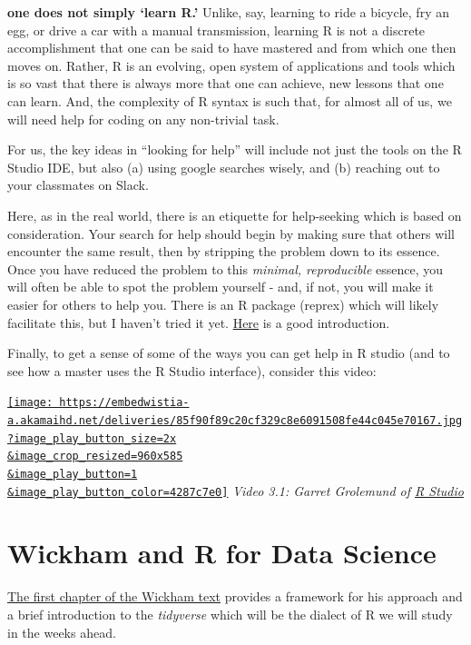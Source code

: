 \documentclass[
  openany]{book}
\begin{document}
\textbf{one does not simply `learn R.'} Unlike, say, learning to ride a bicycle, fry an egg, or drive a car with a manual transmission, learning R is not a discrete accomplishment that one can be said to have mastered and from which one then moves on. Rather, R is an evolving, open system of applications and tools which is so vast that there is always more that one can achieve, new lessons that one can learn. And, the complexity of R syntax is such that, for almost all of us, we will need help for coding on any non-trivial task.

For us, the key ideas in ``looking for help'' will include not just the tools on the R Studio IDE, but also (a) using google searches wisely, and (b) reaching out to your classmates on Slack.

Here, as in the real world, there is an etiquette for help-seeking which is based on consideration. Your search for help should begin by making sure that others will encounter the same result, then by stripping the problem down to its essence. Once you have reduced the problem to this \emph{minimal, reproducible} essence, you will often be able to spot the problem yourself - and, if not, you will make it easier for others to help you. There is an R package (reprex) which will likely facilitate this, but I haven't tried it yet. \href{https://www.tidyverse.org/help/}{Here} is a good introduction.

Finally, to get a sense of some of the ways you can get help in R studio (and to see how a master uses the R Studio interface), consider this video:

\href{https://www.rstudio.com/resources/webinars/rstudio-essentials-webinar-series-part-1/?wvideo=k8kz4e0p2v}{\texttt{[image: https://embedwistia-a.akamaihd.net/deliveries/85f90f89c20cf329c8e6091508fe44c045e70167.jpg?image\_play\_button\_size=2x\\\&image\_crop\_resized=960x585\\\&image\_play\_button=1\\\&image\_play\_button\_color=4287c7e0]}}
\emph{Video 3.1: Garret Grolemund of \href{https://www.rstudio.com/}{R Studio}}

\hypertarget{wickham-and-r-for-data-science}{%
\section{Wickham and R for Data Science}\label{wickham-and-r-for-data-science}}

\href{https://r4ds.had.co.nz/introduction.html}{The first chapter of the Wickham text} \citep{wickham2016r} provides a framework for his approach and a brief introduction to the \emph{tidyverse} which will be the dialect of R we will study in the weeks ahead.
\end{document}
